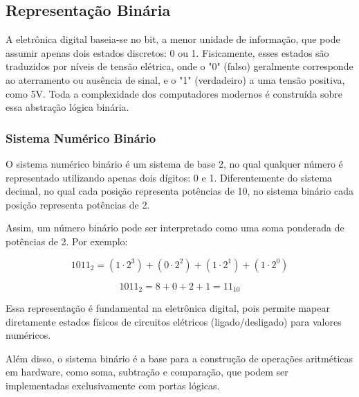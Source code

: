 \subsection{Representação Binária}
\label{sec:binario}

A eletrônica digital baseia-se no bit, a menor unidade de informação, que pode assumir apenas dois estados discretos: 0 ou 1. Fisicamente, esses estados são traduzidos por níveis de tensão elétrica, onde o "0" (falso) geralmente corresponde ao aterramento ou ausência de sinal, e o "1" (verdadeiro) a uma tensão positiva, como 5V. Toda a complexidade dos computadores modernos é construída sobre essa abstração lógica binária.

\subsubsection{Sistema Numérico Binário}

O sistema numérico binário é um sistema de base 2, no qual qualquer número é representado utilizando apenas dois dígitos: 0 e 1. Diferentemente do sistema decimal, no qual cada posição representa potências de 10, no sistema binário cada posição representa potências de 2.

Assim, um número binário pode ser interpretado como uma soma ponderada de potências de 2. Por exemplo:

\[
1011_2 = (1 \cdot 2^3) + (0 \cdot 2^2) + (1 \cdot 2^1) + (1 \cdot 2^0)
\]

\[
1011_2 = 8 + 0 + 2 + 1 = 11_{10}
\]

Essa representação é fundamental na eletrônica digital, pois permite mapear diretamente estados físicos de circuitos elétricos (ligado/desligado) para valores numéricos.

Além disso, o sistema binário é a base para a construção de operações aritméticas em hardware, como soma, subtração e comparação, que podem ser implementadas exclusivamente com portas lógicas.